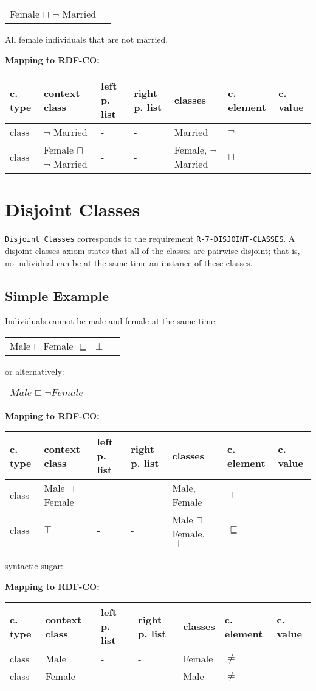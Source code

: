 \documentclass{llncs}
\newcommand{\ms}[1]{\texttt{#1}}
\newenvironment{gcotable}{
  \scriptsize
  \sffamily
  \vspace{0cm}
	\begin{center}
	\textbf{\vspace{0.4cm}Mapping to RDF-CO:} \\
  \begin{tabular}{l|l|l|l|l|l|l}
	\hline
  \textbf{c. type} & \textbf{context class} & \textbf{left p. list} & \textbf{right p. list} & \textbf{classes} & \textbf{c. element} & \textbf{c. value} \\
  \hline

}{
  \hline
  \end{tabular}
	\end{center}
}
\newenvironment{DL}{
  \vspace{0cm}
	\begin{center}
  \begin{tabular}{r l}

}{
  \end{tabular}
	\end{center}
}
\begin{document}
\begin{DL}
Female $\sqcap$ $\neg$ Married \\
\end{DL}

All female individuals that are not married.

\begin{gcotable}
class & $\neg$ Married & - & - & Married & $\neg$ \\
class & Female $\sqcap$ $\neg$ Married & - & - & Female, $\neg$ Married & $\sqcap$ \\
\end{gcotable}

\section{Disjoint Classes}

\ms{Disjoint Classes} corresponds to the requirement \ms{R-7-DISJOINT-CLASSES}.
A disjoint classes axiom states that all of the classes are pairwise disjoint; 
that is, no individual can be at the same time an instance of these classes. 

\subsection{Simple Example}

Individuals cannot be male and female at the same time:

\begin{DL}
Male $\sqcap$ Female $\sqsubseteq$ $\perp$\\
\end{DL}

or alternatively:

\begin{DL}
$Male \sqsubseteq \neg Female$
\end{DL}

\begin{gcotable}
class & Male $\sqcap$ Female & - & - & Male, Female & $\sqcap$  \\
class & $\top$ & - & - & Male $\sqcap$ Female, $\perp$ & $\sqsubseteq$ \\
\end{gcotable}

syntactic sugar:

\begin{gcotable}
class & Male & - & - & Female & $\ne$ \\
class & Female & - & - & Male & $\ne$ \\
\end{gcotable}
\end{document}
